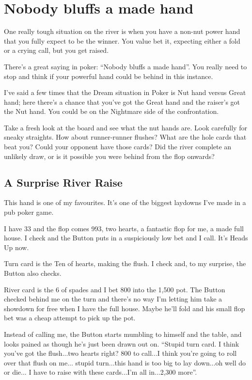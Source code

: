 \chapter{Nobody bluffs a made hand}


One really tough situation on the river is when you have a
non-nut power hand that you fully expect to be the winner.
You value bet it, expecting either a fold or a crying call,
but you get raised.

There's a great saying in poker: ``Nobody bluffs a made hand''.
You really need to stop and think if your powerful hand could
be behind in this instance.

I've said a few times that the Dream situation in
Poker is Nut hand versus Great hand; here there's a chance
that you've got the Great hand and the raiser's got the Nut hand.
You could be on the Nightmare side of the confrontation.

Take a fresh look at the board and see what the nut hands are.
Look carefully for sneaky straights. How about runner-runner flushes?
What are the hole cards that beat you? Could your opponent
have those cards? Did the river complete an unlikely draw, or is it
possible you were behind from the flop onwards?

\section{A Surprise River Raise}

This hand is one of my favourites. It's one of the biggest
laydowns I've made in a pub poker game.

I have 33 and the flop comes 993, two hearts, a fantastic
flop for me, a made full house. I check and the Button puts in a
suspiciously low bet and I call. It's Heads Up now.

Turn card is the Ten of hearts, making the flush. I check and, to my
surprise, the Button also checks.

River card is the 6 of spades and I bet 800 into the 1,500 pot. The Button
checked behind me on the turn and there's no way I'm letting him
take a showdown for free when I have the full house. Maybe he'll fold
and his small flop bet was a cheap attempt to pick up the pot.

Instead of calling me, the Button starts mumbling to himself and the
table, and looks pained as though he's just been drawn out on.
``Stupid turn card. I think you've got the flush...two hearts right?
800 to call...I think you're going to roll over that flush on me...
stupid turn...this hand is too big to lay down...oh well do or die...
I have to raise with these cards...I'm all in...2,300 more''.

